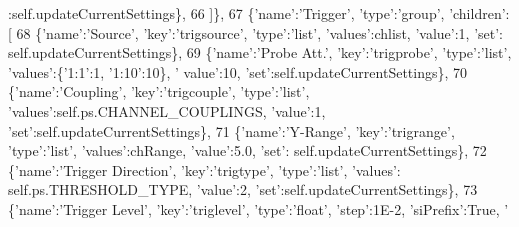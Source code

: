 \begin{DoxyCode}
      :self.updateCurrentSettings\},
66             ]\},
67             \{\textcolor{stringliteral}{'name'}:\textcolor{stringliteral}{'Trigger'}, \textcolor{stringliteral}{'type'}:\textcolor{stringliteral}{'group'}, \textcolor{stringliteral}{'children'}:[
68                 \{\textcolor{stringliteral}{'name'}:\textcolor{stringliteral}{'Source'}, \textcolor{stringliteral}{'key'}:\textcolor{stringliteral}{'trigsource'}, \textcolor{stringliteral}{'type'}:\textcolor{stringliteral}{'list'}, \textcolor{stringliteral}{'values'}:chlist, \textcolor{stringliteral}{'value'}:1, \textcolor{stringliteral}{'set'}:
      self.updateCurrentSettings\},
69                 \{\textcolor{stringliteral}{'name'}:\textcolor{stringliteral}{'Probe Att.'}, \textcolor{stringliteral}{'key'}:\textcolor{stringliteral}{'trigprobe'}, \textcolor{stringliteral}{'type'}:\textcolor{stringliteral}{'list'}, \textcolor{stringliteral}{'values'}:\{\textcolor{stringliteral}{'1:1'}:1, \textcolor{stringliteral}{'1:10'}:10\}, \textcolor{stringliteral}{'
      value'}:10, \textcolor{stringliteral}{'set'}:self.updateCurrentSettings\},
70                 \{\textcolor{stringliteral}{'name'}:\textcolor{stringliteral}{'Coupling'}, \textcolor{stringliteral}{'key'}:\textcolor{stringliteral}{'trigcouple'}, \textcolor{stringliteral}{'type'}:\textcolor{stringliteral}{'list'}, \textcolor{stringliteral}{'values'}:self.ps.CHANNEL\_COUPLINGS, \textcolor{stringliteral}{
      'value'}:1, \textcolor{stringliteral}{'set'}:self.updateCurrentSettings\},
71                 \{\textcolor{stringliteral}{'name'}:\textcolor{stringliteral}{'Y-Range'}, \textcolor{stringliteral}{'key'}:\textcolor{stringliteral}{'trigrange'}, \textcolor{stringliteral}{'type'}:\textcolor{stringliteral}{'list'}, \textcolor{stringliteral}{'values'}:chRange, \textcolor{stringliteral}{'value'}:5.0, \textcolor{stringliteral}{'set'}:
      self.updateCurrentSettings\},
72                 \{\textcolor{stringliteral}{'name'}:\textcolor{stringliteral}{'Trigger Direction'}, \textcolor{stringliteral}{'key'}:\textcolor{stringliteral}{'trigtype'}, \textcolor{stringliteral}{'type'}:\textcolor{stringliteral}{'list'}, \textcolor{stringliteral}{'values'}:
      self.ps.THRESHOLD\_TYPE, \textcolor{stringliteral}{'value'}:2, \textcolor{stringliteral}{'set'}:self.updateCurrentSettings\},
73                 \{\textcolor{stringliteral}{'name'}:\textcolor{stringliteral}{'Trigger Level'}, \textcolor{stringliteral}{'key'}:\textcolor{stringliteral}{'triglevel'}, \textcolor{stringliteral}{'type'}:\textcolor{stringliteral}{'float'}, \textcolor{stringliteral}{'step'}:1E-2, \textcolor{stringliteral}{'siPrefix'}:\textcolor{keyword}{True}, \textcolor{stringliteral}{'
}
\end{DoxyCode}
